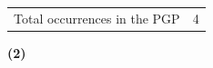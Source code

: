 		\begin{tabular}{ll}
			Total occurrences in the PGP & 4
		\end{tabular}
		
		\begin{compactdesc}
			\item[{\hyperref[MOSES-1-9]{Moses 1:9}}]
			\item[{\hyperref[MOSES-1-15]{Moses 1:15}}]
			\item[{\hyperref[ABRAHAM-2-12]{Abraham 2:12}}] \textbf{(2)}
		\end{compactdesc}
		

	
			
			
	

